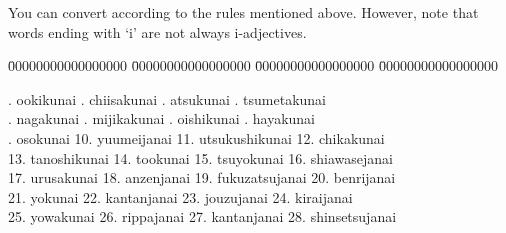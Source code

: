 \documentclass[uplatex,dvipdfmx,b5paper,english,10pt]{jsbook}
\begin{document}
\begin{toianswer}
\ifEnglish
You can convert according to the rules mentioned above.
However, note that words ending with `i' are not always i-adjectives.
\begin{tabbing}
 \=
 00000000000000000 \=
 00000000000000000 \=
 00000000000000000 \=
 00000000000000000 \kill

 . ookikunai      . chiisakunai    . atsukunai      . tsumetakunai   \\

 . nagakunai      . mijikakunai    . oishikunai     . hayakunai      \\

 . osokunai       \>
\hspace{-.5em}10. yuumeijanai      \>
\hspace{-.5em}11. utsukushikunai   \>
\hspace{-.5em}12. chikakunai       \\

\>
\hspace{-.5em}13. tanoshikunai     \>
\hspace{-.5em}14. tookunai         \>
\hspace{-.5em}15. tsuyokunai       \>
\hspace{-.5em}16. shiawasejanai    \\

\>
\hspace{-.5em}17. urusakunai       \>
\hspace{-.5em}18. anzenjanai       \>
\hspace{-.5em}19. fukuzatsujanai   \>
\hspace{-.5em}20. benrijanai       \\

\>
\hspace{-.5em}21. yokunai          \>
\hspace{-.5em}22. kantanjanai      \>
\hspace{-.5em}23. jouzujanai       \>
\hspace{-.5em}24. kiraijanai       \\

\>
\hspace{-.5em}25. yowakunai        \>
\hspace{-.5em}26. rippajanai       \>
\hspace{-.5em}27. kantanjanai      \>
\hspace{-.5em}28. shinsetsujanai   \\


\end{tabbing}
\end{toianswer}
\end{document}
